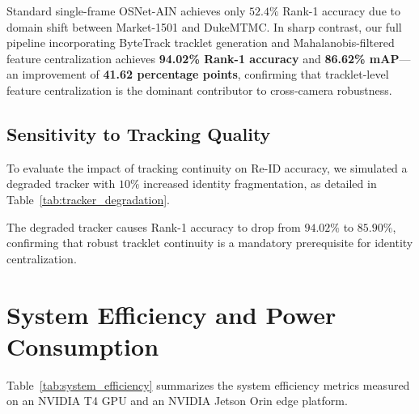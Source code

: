 \documentclass[12pt,a4paper]{report}
\begin{document}
Standard single-frame OSNet-AIN achieves only $52.4\%$ Rank-1 accuracy due to domain shift between Market-1501 and DukeMTMC. In sharp contrast, our full pipeline incorporating ByteTrack tracklet generation and Mahalanobis-filtered feature centralization achieves \textbf{94.02\% Rank-1 accuracy} and \textbf{86.62\% mAP}---an improvement of \textbf{41.62 percentage points}, confirming that tracklet-level feature centralization is the dominant contributor to cross-camera robustness.

\subsection{Sensitivity to Tracking Quality}
To evaluate the impact of tracking continuity on Re-ID accuracy, we simulated a degraded tracker with $10\%$ increased identity fragmentation, as detailed in Table~\ref{tab:tracker_degradation}.

\begin{table}[H]
    \centering
    \caption{Impact of ByteTrack Tracking Quality on Downstream Re-ID.}
    \label{tab:tracker_degradation}
\end{table}

The degraded tracker causes Rank-1 accuracy to drop from $94.02\%$ to $85.90\%$, confirming that robust tracklet continuity is a mandatory prerequisite for identity centralization.

\section{System Efficiency and Power Consumption}
Table~\ref{tab:system_efficiency} summarizes the system efficiency metrics measured on an NVIDIA T4 GPU and an NVIDIA Jetson Orin edge platform.
\end{document}
